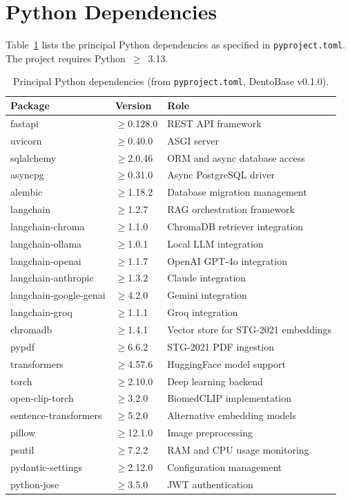 \documentclass[12pt,a4paper]{report}
\begin{document}
\section{Python Dependencies}

Table~\ref{tab:dependencies} lists the principal Python dependencies as
specified in \texttt{pyproject.toml}. The project requires Python~$\geq$~3.13.

\begin{table}[H]
\centering
\caption{Principal Python dependencies (from \texttt{pyproject.toml},
         DentoBase v0.1.0).}
\label{tab:dependencies}
\small
\renewcommand{\arraystretch}{1.2}
\begin{tabularx}{\textwidth}{@{}l l X@{}}
\toprule
\textbf{Package} & \textbf{Version} & \textbf{Role} \\
\midrule
fastapi           & $\geq$0.128.0 & REST API framework \\
uvicorn           & $\geq$0.40.0  & ASGI server \\
sqlalchemy        & $\geq$2.0.46  & ORM and async database access \\
asyncpg           & $\geq$0.31.0  & Async PostgreSQL driver \\
alembic           & $\geq$1.18.2  & Database migration management \\
langchain         & $\geq$1.2.7   & RAG orchestration framework \\
langchain-chroma  & $\geq$1.1.0   & ChromaDB retriever integration \\
langchain-ollama  & $\geq$1.0.1   & Local LLM integration \\
langchain-openai  & $\geq$1.1.7   & OpenAI GPT-4o integration \\
langchain-anthropic& $\geq$1.3.2  & Claude integration \\
langchain-google-genai& $\geq$4.2.0 & Gemini integration \\
langchain-groq    & $\geq$1.1.1   & Groq integration \\
chromadb          & $\geq$1.4.1   & Vector store for STG-2021 embeddings \\
pypdf             & $\geq$6.6.2   & STG-2021 PDF ingestion \\
transformers      & $\geq$4.57.6  & HuggingFace model support \\
torch             & $\geq$2.10.0  & Deep learning backend \\
open-clip-torch   & $\geq$3.2.0   & BiomedCLIP implementation \\
sentence-transformers & $\geq$5.2.0 & Alternative embedding models \\
pillow            & $\geq$12.1.0  & Image preprocessing \\
psutil            & $\geq$7.2.2   & RAM and CPU usage monitoring \\
pydantic-settings & $\geq$2.12.0  & Configuration management \\
python-jose       & $\geq$3.5.0   & JWT authentication \\
\bottomrule
\end{tabularx}
\end{table}
\end{document}
